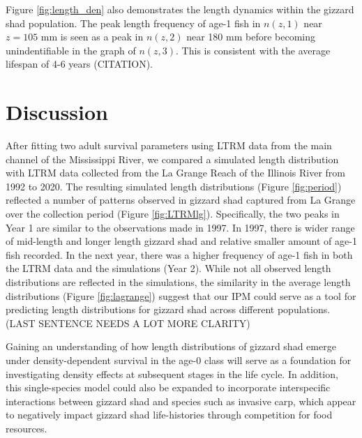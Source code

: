\documentclass[preprint,review,12pt,authoryear]{elsarticle}
\begin{document}
Figure \ref{fig:length_den} also demonstrates the length dynamics within the gizzard shad population.  
The peak length frequency of age-1 fish in $n(z,1)$ near $z = 105$ mm is seen as a peak in $n(z,2)$ near 180 mm before becoming unindentifiable in the graph of $n(z,3)$.  
This is consistent with the average lifespan of 4-6 years (CITATION). 


\section{Discussion}


After fitting two adult survival parameters using LTRM data from the main channel of the Mississippi River, we compared a simulated length distribution with LTRM data collected from the La Grange Reach of the Illinois River from 1992 to 2020. The resulting simulated length distributions (Figure \ref{fig:period}) reflected a number of patterns observed in gizzard shad captured from La Grange over the collection period (Figure \ref{fig:LTRMlg}). 
Specifically, the two peaks in Year 1 are similar to the observations made in 1997.  
In 1997, there is wider range of mid-length and longer length gizzard shad and relative smaller amount of age-1 fish recorded.  
In the next year, there was a higher frequency of age-1 fish in both the LTRM data and the simulations (Year 2).
While not all observed length distributions are reflected in the simulations, the similarity in the average length distributions (Figure \ref{fig:lagrange}) suggest that our IPM could serve as a tool for predicting length distributions for gizzard shad across different populations. (LAST SENTENCE NEEDS A LOT MORE CLARITY)

Gaining an understanding of how length distributions of gizzard shad emerge under density-dependent survival in the age-0 class will serve as a foundation for investigating density effects at subsequent stages in the life cycle.  In addition, this single-species model could also be expanded to incorporate interspecific interactions between gizzard shad and species such as invasive carp, which appear to negatively impact gizzard shad life-histories through competition for food resources.   
\end{document}
